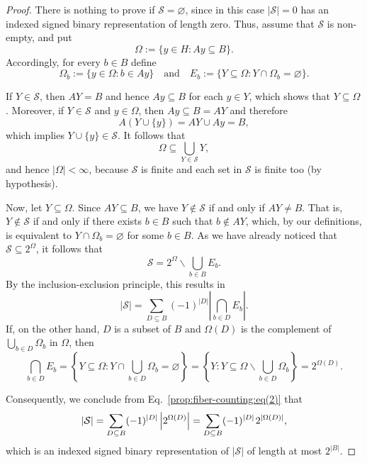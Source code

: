 \documentclass[11pt,reqno]{amsart}
\theoremstyle{definition}
\theoremstyle{remark}
\theoremstyle{theoremdd}
\renewcommand{\emptyset}{\varnothing}
\renewcommand{\setminus}{\smallsetminus}
\renewcommand{\,}{\kern 0.1em}
\begin{document}
\begin{proof}
There is nothing to prove if $\mathcal S=\emptyset$, since in this case
$|\mathcal S|=0$ has an indexed signed binary representation of length
zero. Thus, assume that $\mathcal S$ is non-empty, and put
\[
\Omega := \{y \in H: Ay \subseteq B\}.
\]
Accordingly, for every $b \in B$ define
%
\begin{equation}
\label{prop:fiber-counting:eq(1)}
\Omega_b := \{y \in \Omega: b \in Ay\} 
\quad\text{and}\quad
E_b := \{Y \subseteq \Omega: Y \cap \Omega_b = \emptyset\}.
\end{equation}

If $Y \in \mathcal S$, then $AY = B$ and hence $Ay \subseteq B$ for each $y \in Y$, which shows that $Y \subseteq \Omega$. Moreover, if $Y \in \mathcal S$ and $y \in \Omega$, then $Ay \subseteq B = AY$ and therefore
\[
A(Y \cup \{y\}) = AY \cup Ay = B,
\]
which implies $Y \cup \{y\} \in \mathcal S$. It follows that 
\[
\Omega \subseteq \bigcup_{Y \in \mathcal S} Y, 
\]
and hence $|\Omega| < \infty$, because $\mathcal S$ is finite and each set in $\mathcal S$ is finite too (by hypothesis).

Now, let $Y \subseteq \Omega$. Since $AY \subseteq B$, we have
$Y \notin \mathcal S$ if and only if $AY \neq B$. That is, $Y \notin \mathcal S$ if and only if
there exists $b \in B$ such that $b \notin AY$, which, by our definitions, is equivalent to $Y \cap \Omega_b = \allowbreak \emptyset$ for some $b \in B$. As we have already noticed that $\mathcal S \subseteq 2^\Omega$, it follows that
\[
\mathcal S = 2^{\Omega} \setminus \bigcup_{b \in B} E_b.
\]
By the inclusion-exclusion principle, this results in
\begin{equation}
\label{prop:fiber-counting:eq(2)}
|\mathcal S| = \sum_{D\subseteq B}
(-1)^{|D|} \left|\bigcap_{b \in D} E_b \right|.
\end{equation}
If, on the other hand, $D$ is a subset of $B$ and $\Omega(D)$ is the complement of $\bigcup_{b \in D} \Omega_b$ in $\Omega$, then
\[
\bigcap_{b \in D} E_b 
= \left\{Y \subseteq \Omega: Y \cap \bigcup_{b \in D} \Omega_b = \emptyset\right\} = \left\{Y: Y \subseteq \Omega \setminus \bigcup_{b \in D} \Omega_b\right\} = 2^{\Omega(D)}.
\]

Consequently, we conclude from Eq.~\eqref{prop:fiber-counting:eq(2)} that
\[
|\mathcal S| = \sum_{D\subseteq B}
(-1)^{|D|} \left|2^{\Omega(D)}\right| = \sum_{D\subseteq B}
(-1)^{|D|} \, 2^{|\Omega(D)|},
\]
which is an indexed signed binary representation of $|\mathcal S|$ of
length at most $2^{|B|}$.
\end{proof}
\end{document}
